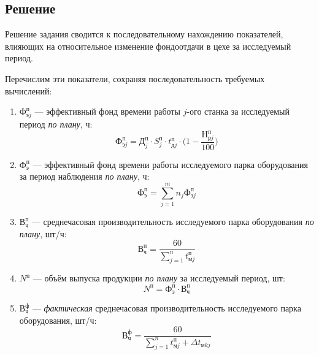 \newpage

\subsection{Решение}

Решение задания сводится к последовательному нахождению показателей,
влияющих на относительное изменение фондоотдачи в цехе за исследуемый период.

Перечислим эти показатели, сохраняя последовательность требуемых вычислений:

\begin{enumerate}

  \item $ \text{Ф}^{\text{п}}_{\text{э}j} $ --- эффективный фонд времени работы $j$-ого станка
    за исследуемый период \textit{по плану}, ч:
    \begin{equation*}
      \text{Ф}^{\text{п}}_{\text{э}j} =
      \text{Д}^{\text{п}}_j \cdot S^{\text{п}}_j
      \cdot t^{\text{п}}_{\text{д}j} \cdot \Big(1 - \dfrac{\text{Н}^{\text{п}}_{\text{р}j}}{100} \Big)
    \end{equation*}

  \item $ \text{Ф}^{\text{п}}_{\text{э}} $ --- эффективный фонд времени работы исследуемого парка
    оборудования за период наблюдения \textit{по плану}, ч:
    \begin{equation*}
      \text{Ф}^{\text{п}}_{\text{э}} =
      \sum\limits_{j=1}^{m}n_j \text{Ф}^{\text{п}}_{\text{э}j}
    \end{equation*}

  \item $ \text{В}^{\text{п}}_{\text{ч}} $ --- среднечасовая производительность исследуемого парка
    оборудования \textit{по плану}, шт/ч:
    \begin{equation*}
      \text{В}^{\text{п}}_{\text{ч}} =
      \dfrac{60}{\sum\limits_{j=1}^{n} t^{\text{п}}_{\text{м}j}}
    \end{equation*}

  \item $ N^{\text{п}} $ --- объём выпуска продукции \textit{по плану} за исследуемый период, шт:
    \begin{equation*}
      N^{\text{п}} = \text{Ф}^{\text{п}}_{\text{э}} \cdot \text{В}^{\text{п}}_{\text{ч}}
    \end{equation*}

  \item $ \text{В}^{\text{ф}}_{\text{ч}} $ --- \textit{фактическая} среднечасовая производительность
    исследуемого парка оборудования, шт/ч:
    \begin{equation*}
      \text{В}^{\text{ф}}_{\text{ч}} =
      \dfrac{60}{\sum\limits_{j=1}^{n} t^{\text{п}}_{\text{м}j} + \Delta t_{\text{м}kj}}
    \end{equation*}


\end{enumerate}
